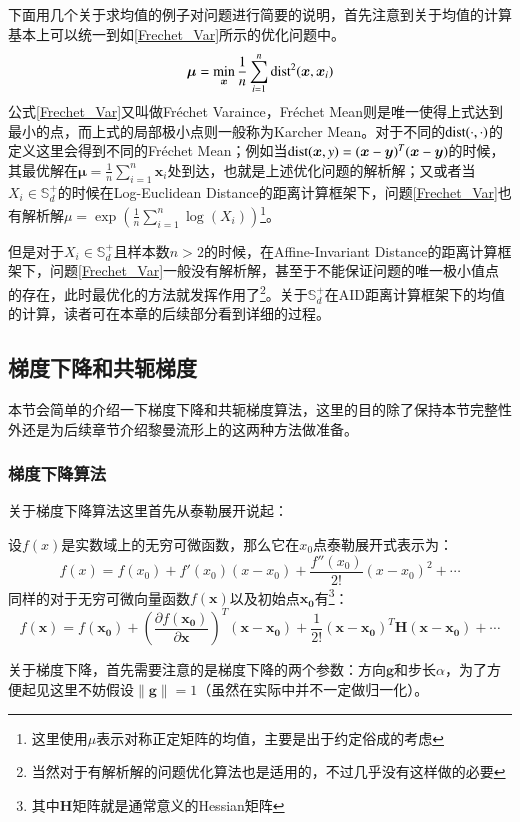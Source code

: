 下面用几个关于求均值的例子对问题进行简要的说明，首先注意到关于均值的计算基本上可以统一到如\ref{Frechet_Var}所示的优化问题中。
\begin{equation}
\label{Frechet_Var}
\bm{\mu}=\min_{\bm{x}}\frac{1}{n}\sum_{i=1}^{n}{\rm dist}^{2}(\bm{x},\bm{x}_i)
\end{equation}
公式\ref{Frechet_Var}又叫做Fr\'echet Varaince，Fr\'echet Mean则是唯一使得上式达到最小的点，而上式的局部极小点则一般称为Karcher Mean。对于不同的${\rm dist}(\cdot,\cdot)$的定义这里会得到不同的Fr\'echet Mean；例如当${\rm dist}(\bm{x},y)=(\bm{x}-\bm{y})^{T}(\bm{x}-\bm{y})$的时候，其最优解在$\bm{\mu}=\frac{1}{n}\sum_{i=1}^{n}\bm{x}_i$处到达，也就是上述优化问题的解析解；又或者当$X_i\in \mathbb{S}_{d}^{+}$的时候在Log-Euclidean Distance\cite{LEM_metric}的距离计算框架下，问题\ref{Frechet_Var}也有解析解$\mu=\exp(\frac{1}{n}\sum_{i=1}^{n}\log(X_i))$\footnote{这里使用$\mu$表示对称正定矩阵的均值，主要是出于约定俗成的考虑}。

但是对于$X_i\in \mathbb{S}_{d}^{+}$且样本数$n>2$的时候，在Affine-Invariant Distance\cite{AIM_metric}的距离计算框架下，问题\ref{Frechet_Var}一般没有解析解，甚至于不能保证问题的唯一极小值点的存在，此时最优化的方法就发挥作用了\footnote{当然对于有解析解的问题优化算法也是适用的，不过几乎没有这样做的必要}。关于$\mathbb{S}_{d}^{+}$在AID\cite{AIM_metric}距离计算框架下的均值的计算，读者可在本章的后续部分看到详细的过程。

\subsection{梯度下降和共轭梯度}
本节会简单的介绍一下梯度下降和共轭梯度算法，这里的目的除了保持本节完整性外还是为后续章节介绍黎曼流形上的这两种方法做准备。
\subsubsection{梯度下降算法}
关于梯度下降算法这里首先从泰勒展开说起：
\begin{definition}
设$f(x)$是实数域上的无穷可微函数，那么它在$x_0$点泰勒展开式表示为：%
\begin{equation}
\label{Taylor_Extention_1}
f(x)=f(x_0)+f'(x_0)(x-x_0)+\frac{f''(x_0)}{2!}(x-x_0)^2+\cdots
\end{equation}
同样的对于无穷可微向量函数$f(\bm{x})$以及初始点$\bm{x_0}$有\footnote{其中$\bm{H}$矩阵就是通常意义的Hessian矩阵}：
\begin{equation}
\label{Taylor_Extention_d}
f(\bm{x})=f(\bm{x_0})+\left(\frac{\partial f(\bm{x_0})}{\partial \bm{x}}\right)^{T}(\bm{x-x_0})+\frac{1}{2!}(\bm{x-x_0})^{T}\bm{H}(\bm{x-x_0})+\cdots
\end{equation}
\end{definition}
关于梯度下降，首先需要注意的是梯度下降的两个参数：方向$\bm{g}$和步长$\alpha$，为了方便起见这里不妨假设$\|\bm{g}\|=1$（虽然在实际中并不一定做归一化）。


